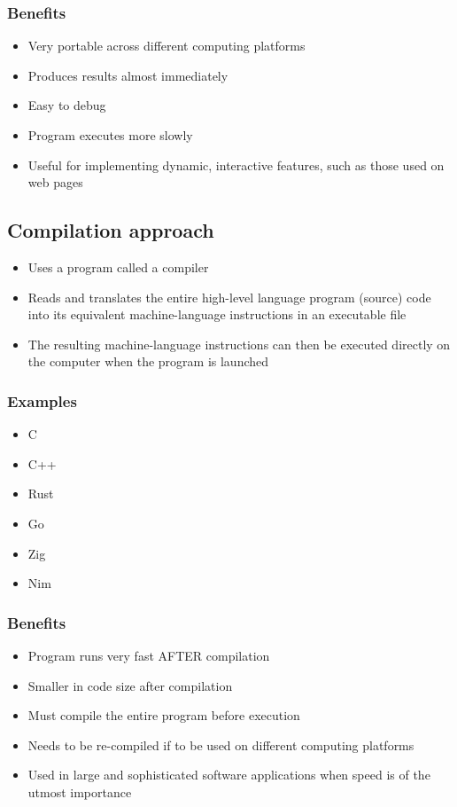 \documentclass[11pt]{article}
\begin{document}
\subsubsection{Benefits}
\label{sec:org336ba2a}
\begin{itemize}
\item Very portable across different computing platforms
\item Produces results almost immediately
\item Easy to debug
\item Program executes more slowly
\item Useful for implementing dynamic, interactive features, such as those used on web pages
\end{itemize}

 \newpage
\subsection{Compilation approach}
\label{sec:org28fab4b}
\begin{itemize}
\item Uses a program called a compiler
\item Reads and translates the entire high-level language program (source) code into its equivalent machine-language instructions in an executable file
\item The resulting machine-language instructions can then be executed directly on the computer when the program is launched
\end{itemize}
\subsubsection{Examples}
\label{sec:org501d1d9}
\begin{itemize}
\item C
\item C++
\item Rust
\item Go
\item Zig
\item Nim
\end{itemize}
\subsubsection{Benefits}
\label{sec:orgfb87bac}
\begin{itemize}
\item Program runs very fast AFTER compilation
\item Smaller in code size after compilation
\item Must compile the entire program before execution
\item Needs to be re-compiled if to be used on different computing platforms
\item Used in large and sophisticated software applications when speed is of the utmost importance
\end{itemize}
\end{document}
